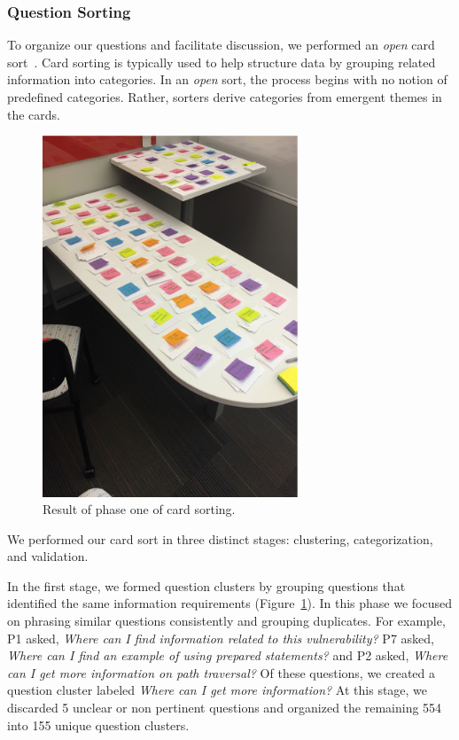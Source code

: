 \documentclass[conference]{IEEEtran}
\begin{document}
\subsubsection{Question Sorting}
To organize our questions and facilitate discussion, we performed an \textit{open} card sort~\cite{hudson2013sorting}. 
Card sorting is typically used to help structure data by grouping related information into categories. 
In an \textit{open} sort, the process begins with no notion of predefined categories. 
Rather, sorters derive categories from emergent themes in the cards. 

\begin{figure}
\centering
\includegraphics[width=3in]{Images/notecards.pdf}
\caption{Result of phase one of card sorting.}
\label{fig:stageOne} 
\end{figure}

We performed our card sort in three distinct stages: clustering, categorization, and validation.
 
In the first stage, we formed question clusters by grouping questions that identified the same information requirements (Figure~\ref{fig:stageOne}). 
In this phase we focused on phrasing similar questions consistently and grouping duplicates.
For example, P1 asked, \textit{Where can I find information related to this vulnerability?} P7 asked, \textit{Where can I find an example of using prepared statements?} and P2 asked, \textit{Where can I get more information on path traversal?} 
Of these questions, we created a question cluster labeled \textit{Where can I get more information?}
At this stage, we discarded 5 unclear or non pertinent questions and organized the remaining 554 into 155 unique question clusters.
\end{document}
